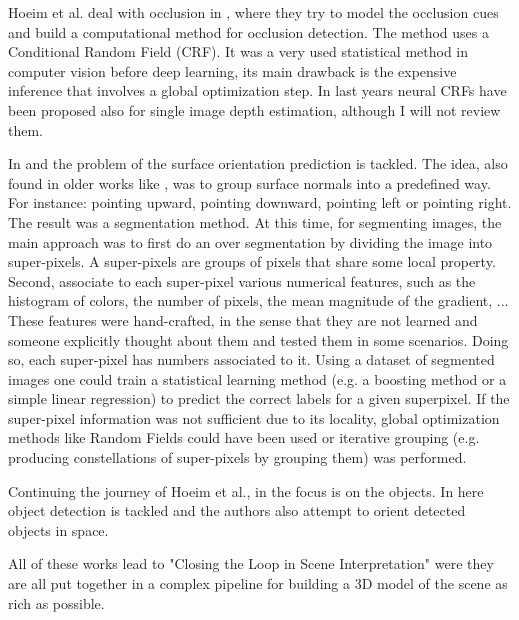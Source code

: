 Hoeim et al. deal with occlusion in \cite{autopopup4}, where they try to model the occlusion cues and build a computational method for occlusion detection.
The method uses a Conditional Random Field (CRF).
It was a very used statistical method in computer vision before deep learning, its main drawback is the expensive inference that involves a global optimization step.
In last years neural CRFs have been proposed also for single image depth estimation, although I will not review them.

In \cite{autopopup2} and \cite{autopopup5} the problem of the surface orientation prediction is tackled.
The idea, also found in older works like \cite{VideoCompass}, was to group surface normals into a predefined way.
For instance: pointing upward, pointing downward, pointing left or pointing right.
The result was a segmentation method.
At this time, for segmenting images, the main approach was to first do an over segmentation by dividing the image into super-pixels.
A super-pixels are groups of pixels that share some local property.
Second, associate to each super-pixel various numerical features, such as the histogram of colors, the number of pixels, the mean magnitude of the gradient, ...
These features were hand-crafted, in the sense that they are not learned and someone explicitly thought about them and tested them in some scenarios.
Doing so, each super-pixel has numbers associated to it.
Using a dataset of segmented images one could train a statistical learning method (e.g. a boosting method or a simple linear regression) to predict the correct labels for a given superpixel.
If the super-pixel information was not sufficient due to its locality, global optimization methods like Random Fields could have been used or iterative grouping (e.g. producing constellations of super-pixels by grouping them) was performed.

Continuing the journey of Hoeim et al., in \cite{autopopup3} the focus is on the objects.
In here object detection is tackled and the authors also attempt to orient detected objects in space.

All of these works lead to "Closing the Loop in Scene Interpretation" \cite{autopopup6} were they are all put together in a complex pipeline for building a 3D model of the scene as rich as possible.

